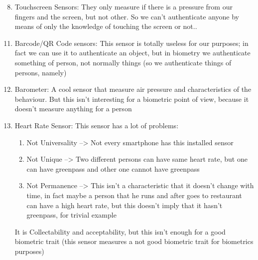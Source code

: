 \documentclass[12pt]{article}
\begin{document}
\begin{enumerate}
  \setcounter{enumi}{7}
    
    \item Touchscreen Sensors: They only measure if there is a pressure from our fingers and the screen, but not other. So we can't authenticate anyone by means of only the knowledge of touching the screen or not..

\end{enumerate}
    
\begin{enumerate}
  \setcounter{enumi}{10}
    \item Barcode/QR Code sensors: This sensor is totally useless for our purposes; in fact we can use it to authenticate an object, but in biometry we authenticate something of person, not normally things (so we authenticate things of persons, namely)

    \item Barometer: A cool sensor that measure air pressure and characteristics of the behaviour. But this isn't interesting for a biometric point of view, because it doesn't measure anything for a person

    \item Heart Rate Sensor: This sensor has a lot of problems:
    
    \begin{enumerate}
    
    \item Not Universality --> Not every smartphone has this installed sensor
    \item Not Unique --> Two different persons can have same heart rate, but one can have greenpass and other one cannot have greenpass
    \item Not Permanence --> This isn't a characteristic that it doesn't change with time, in fact maybe a person that he runs and after goes to restaurant can have a high heart rate, but this doesn't imply that it hasn't greenpass, for trivial example
    
    \end{enumerate}
    
It is Collectability and acceptability, but this isn't enough for a good biometric trait (this sensor measures a not good biometric trait for biometrics purposes)


\end{enumerate}
\end{document}
